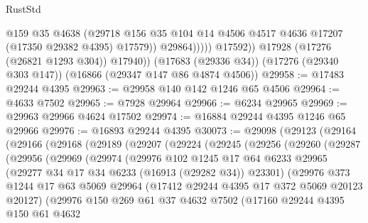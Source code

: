 \begin{lexlean}{RustStd}
\begin{coremodule}
                        @159
                        @35
                        @4638
                        (@29718
                          @156
                          @35
                          @104
                          @14
                          @4506
                          @4517
                          @4636
                          @17207
                          (@17350 @29382 @4395)
                          @17579))
                      @29864)))))
            @17592))
        @17928
        (@17276 (@26821 @1293 @304))
        @17940))
    (@17683 (@29336 @34))
    (@17276 (@29340 @303 @147))
    (@16866 (@29347 @147 @86 @4874 @4506))
@29958 := @17483 @29244 @4395
@29963 := @29958 @140 @142 @1246 @65 @4506
@29964 := @4633 @7502
@29965 := @7928 @29964
@29966 := @6234 @29965
@29969 := @29963 @29966 @4624 @17502
@29974 := @16884 @29244 @4395 @1246 @65 @29966
@29976 := @16893 @29244 @4395
@30073 := @29098
    (@29123
      (@29164
        (@29166
          (@29168
            (@29189
              (@29207
                (@29224
                  (@29245
                    (@29256
                      (@29260
                        (@29287
                          (@29956
                            (@29969
                              (@29974
                                (@29976
                                  @102
                                  @1245
                                  @17
                                  @64
                                  @6233
                                  @29965
                                  (@29277 @34 @17 @34 @6233 (@16913 (@29282 @34)) @23301)
                                  (@29976
                                    @373
                                    @1244
                                    @17
                                    @63
                                    @5069
                                    @29964
                                    (@17412 @29244 @4395 @17 @372 @5069 @20123 @20127)
                                    (@29976
                                      @150
                                      @269
                                      @61
                                      @37
                                      @4632
                                      @7502
                                      (@17160
                                        @29244
                                        @4395
                                        @150
                                        @61
                                        @4632

\end{coremodule}
\end{lexlean}
